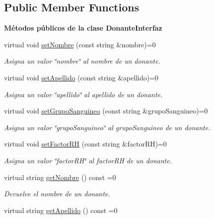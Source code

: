 \subsection*{Public Member Functions}
\begin{Indent}{\bf Métodos públicos de la clase Donante\-Interfaz}\par
\begin{DoxyCompactItemize}
\item 
virtual void \hyperlink{classed_1_1DonanteInterfaz_a4125f376530591b4f0a8f7d2f294ecb6}{set\-Nombre} (const string \&nombre)=0
\begin{DoxyCompactList}\small\item\em Asigna un valor \char`\"{}nombre\char`\"{} al nombre de un donante. \end{DoxyCompactList}\item 
virtual void \hyperlink{classed_1_1DonanteInterfaz_a6556974eb878ea122f6d2f6addf9fbfd}{set\-Apellido} (const string \&apellido)=0
\begin{DoxyCompactList}\small\item\em Asigna un valor \char`\"{}apellido\char`\"{} al apellido de un donante. \end{DoxyCompactList}\item 
virtual void \hyperlink{classed_1_1DonanteInterfaz_a313d06006b89e8754bd18e6ee6e712c9}{set\-Grupo\-Sanguineo} (const string \&grupo\-Sanguineo)=0
\begin{DoxyCompactList}\small\item\em Asigna un valor \char`\"{}grupo\-Sanguineo\char`\"{} al grupo\-Sanguineo de un donante. \end{DoxyCompactList}\item 
virtual void \hyperlink{classed_1_1DonanteInterfaz_ab75c31670ebf83b9cb081a026d2b943c}{set\-Factor\-R\-H} (const string \&factor\-R\-H)=0
\begin{DoxyCompactList}\small\item\em Asigna un valor \char`\"{}factor\-R\-H\char`\"{} al factor\-R\-H de un donante. \end{DoxyCompactList}\item 
virtual string \hyperlink{classed_1_1DonanteInterfaz_a907becd8ffab6ea63c026bec0666fa03}{get\-Nombre} () const =0
\begin{DoxyCompactList}\small\item\em Devuelve el nombre de un donante. \end{DoxyCompactList}\item 
virtual string \hyperlink{classed_1_1DonanteInterfaz_af318d1ba60b3ef9450218a30e980d3a6}{get\-Apellido} () const =0

\end{DoxyCompactItemize}
\end{Indent}
